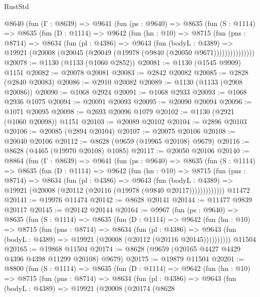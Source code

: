 \begin{lexlean}{RustStd}
\begin{coremodule}
    @8640
      (fun (Γ : @8639) =>
      @9641
        (fun (ps : @9640) =>
        @8635
          (fun (S : @1114) =>
          @8635
            (fun (D : @1114) =>
            @9642
              (fun (hn : @10) =>
              @8715
                (fun (pns : @8714) =>
                @8634
                  (fun (pl : @4386) =>
                  @9643
                    (fun (bodyL : @4389) =>
                    @19921 (@20008 (@20045 (@20049 (@19978 (@9840 (@20050 @9671)))))))))))))))
@20078 := @1130 (@1133 (@1060 @2852))
@20081 := @1130 (@1545 @9909) @1151
@20082 := @20078 @20081
@20083 := @2842 @20082
@20085 := @2828 (@2840 @20083)
@20086 := @2910 @20082
@20089 := @1130 (@1133 (@2908 @20086))
@20090 := @1068 @2924
@20091 := @1068 @2933
@20093 := @1068 @2936 @1075
@20094 := @20091 @20093
@20095 := @20090 @20094
@20096 := @1071 @20095
@20098 := @2693 @20096 @1079
@20102 := @1130 (@2921 (@1060 @20098)) @1151
@20103 := @20089 @20102
@20104 := @2896 @20103
@20106 := @20085 (@2894 @20104)
@20107 := @20075 @20106
@20108 := @20040 @20106
@20112 := @8628 (@9659 (@19965 @20108) @9679)
@20116 := @8628 (@4465 (@19970 @20108) @1085)
@20117 := @20050 @20106
@20140 := @8864
    (fun (Γ : @8639) =>
    @9641
      (fun (ps : @9640) =>
      @8635
        (fun (S : @1114) =>
        @8635
          (fun (D : @1114) =>
          @9642
            (fun (hn : @10) =>
            @8715
              (fun (pns : @8714) =>
              @8634
                (fun (pl : @4386) =>
                @9643
                  (fun (bodyL : @4389) =>
                  @19921 (@20008 (@20112 (@20116 (@19978 (@9840 @20117)))))))))))))
    @11472
@20141 := @19976 @11474
@20142 := @8628 @20141
@20144 := @11477 @9839 @20117
@20145 := @20142 @20144
@20164 := @9967
    (fun (ps : @9640) =>
    @8635
      (fun (S : @1114) =>
      @8635
        (fun (D : @1114) =>
        @9642
          (fun (hn : @10) =>
          @8715
            (fun (pns : @8714) =>
            @8634
              (fun (pl : @4386) =>
              @9643 (fun (bodyL : @4389) => @19921 (@20008 (@20112 (@20116 @20145))))))))))
    @11504
@20165 := @19868 @11504
@20174 := @8628 (@9659 (@20165 @4427 @4429 @4396 @4398 @11299 @20108) @9679)
@20175 := @19879 @11504
@20201 := @8800
    (fun (S : @1114) =>
    @8635
      (fun (D : @1114) =>
      @9642
        (fun (hn : @10) =>
        @8715
          (fun (pns : @8714) =>
          @8634
            (fun (pl : @4386) =>
            @9643
              (fun (bodyL : @4389) =>
              @19921
                (@20008
                  (@20174
                    (@8628

\end{coremodule}
\end{lexlean}
